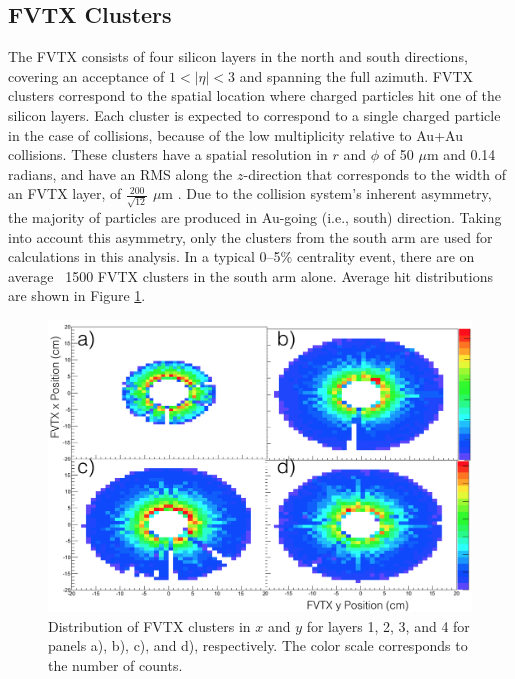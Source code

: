 
\subsection{FVTX Clusters}
The FVTX consists of four silicon layers in the north and south directions, covering an acceptance of $1 < | \eta | < 3$ and spanning the full azimuth. FVTX clusters correspond to the spatial location where charged particles hit one of the silicon layers. Each cluster is expected to correspond to a single charged particle in the case of \pau collisions, because of the low multiplicity relative to Au+Au collisions. These clusters have a spatial resolution in $r$ and $\phi$ of 50 $\mu$m and 0.14 radians, and have an RMS along the $z$-direction that corresponds to the width of an FVTX layer, of $\frac{200}{\sqrt{12}}$ $\mu$m \cite{Aidala201444}. Due to the \pau collision system's inherent asymmetry, the majority of particles are produced in Au-going (i.e., south) direction. Taking into account this asymmetry, only the clusters from the south arm are used for calculations in this analysis. In a typical 0--5$\%$ centrality event, there are on average ~1500 FVTX clusters in the south arm alone. Average hit distributions are shown in Figure \ref{fig:fvtx_clusxy}.

\begin{figure}[!h]
\begin{center}
\includegraphics[width=0.55\linewidth]{figs/fvtx_clus_xy.png}
\caption{Distribution of FVTX clusters in $x$ and $y$ for layers 1, 2, 3, and 4 for panels a), b), c), and d), respectively. The color scale corresponds to the number of counts.}
\label{fig:fvtx_clusxy}
\end{center}
\end{figure}

